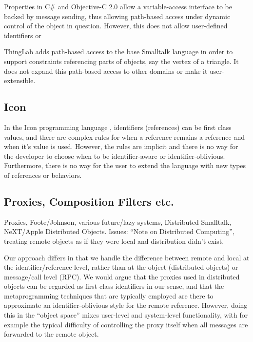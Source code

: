 \documentclass[preprint,authoryear]{acm_proc_article-sp}
\begin{document}
Properties in C\# and Objective-C 2.0 allow a variable-access interface to be backed by 
message sending, thus allowing path-based access under dynamic control of the object
in question.  However, this does not allow user-defined identifiers or 

ThingLab\cite{thinglab}  adds path-based access to the base Smalltalk language in order to support
constraints referencing parts of objects, say the vertex of a triangle.   It does not
expand this path-based access to other domains or make it user-extensible.


\subsection{Icon}

In the Icon programming language \cite{IconRef} , identifiers (references) can be first class values,
and there are complex rules for when a reference remains a reference and when
it's value is used.  However, the rules are implicit and there is no way for the 
developer to choose when to be identifier-aware or identifier-oblivious.  Furthermore,
there is no way for the user to extend the language with new types of references 
or behaviors.



\subsection{Proxies, Composition Filters etc.}

Proxies\cite{VanCutsemMiller}, Foote/Johnson, various future/lazy systems, Distributed Smalltalk,
NeXT/Apple Distributed Objects.  Issues:  ``Note on Distributed Computing'', treating
remote objects as if they were local and distribution didn't exist.  

Our approach differs in that we handle the difference between remote and local at
the identifier/reference level, rather than at the object (distributed objects) or 
message/call level (RPC).  We would argue that the proxies used in distributed
objects can be regarded as first-class identifiers in our sense, and that the 
metaprogramming techniques that are typically employed are there to approximate
an identifier-oblivious style for the remote reference.  However, doing this
in the ``object space'' mixes user-level and system-level functionality, with
for example the typical difficulty of controlling the proxy itself when all messages
are forwarded to the remote object.
\end{document}
